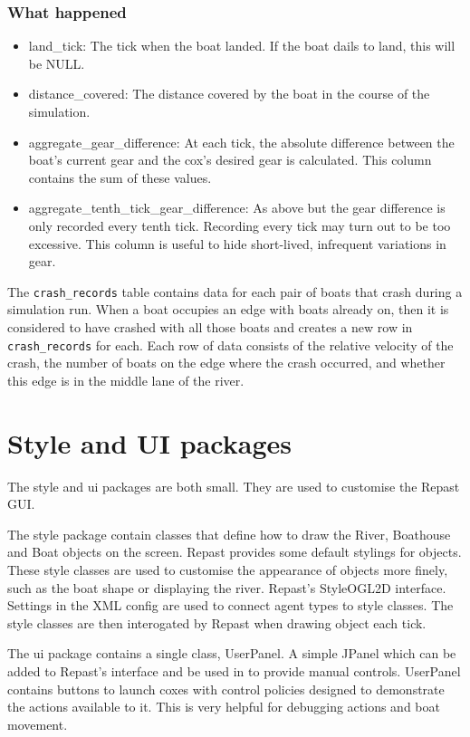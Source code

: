 {\subsubsection{What happened}
\begin{itemize}
  \item{land\_tick:} The tick when the boat landed. If the boat dails
    to land, this will be NULL.
  \item{distance\_covered:} The distance covered by the boat in the
    course of the simulation.
  \item{aggregate\_gear\_difference:} At each tick, the absolute
    difference between the boat's current gear and the cox's desired
    gear is calculated. This column contains the sum of these values.
  \item{aggregate\_tenth\_tick\_gear\_difference:} As above but the
    gear difference is only recorded every tenth tick. Recording every
    tick may turn out to be too excessive. This column is useful to
    hide short-lived, infrequent variations in gear.
\end{itemize}

The \texttt{crash\_records} table contains data for each pair of boats that crash during a simulation run. When a boat occupies an edge with boats already on, then it is considered to have crashed with all those boats and creates a new row in \texttt{crash\_records} for each. Each row of data consists of the relative velocity of the crash, the number of boats on the edge where the crash occurred, and whether this edge is in the middle lane of the river.

\section{Style and UI packages}
The style and ui packages are both small. They are used to customise the Repast
GUI. 

The style package contain classes
that define how to draw the River, Boathouse and Boat objects on the
screen. Repast provides some default stylings for objects. These style
classes are used to customise the appearance of objects more finely,
such as the boat shape or displaying the river.
Repast's StyleOGL2D interface. Settings in the XML config are used to
connect agent types to style classes. The style classes are then
interogated by Repast when drawing object each tick.

The ui package contains a single class, UserPanel. A simple JPanel which
can be added to Repast's interface and be used in to provide manual
controls. UserPanel contains buttons to launch coxes with control
policies designed to demonstrate the actions available to it. This is
very helpful for debugging actions and boat movement.

}
